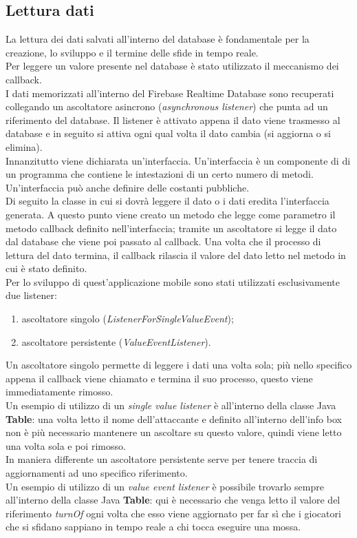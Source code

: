 \documentclass[a4paper,11pt,twoside,openright]{report}
\begin{document}
\subsection{Lettura dati}
La lettura dei dati salvati all'interno del database è fondamentale per la creazione, lo sviluppo e il termine delle sfide in tempo reale.\\
Per leggere un valore presente nel database è stato utilizzato il meccanismo dei callback.\\
I dati memorizzati all'interno del Firebase Realtime Database sono recuperati collegando un ascoltatore asincrono (\textit{asynchronous listener}) che punta ad un riferimento del database. Il listener è attivato appena il dato viene trasmesso al database e in seguito si attiva ogni qual volta il dato cambia (si aggiorna o si elimina).\\
Innanzitutto viene dichiarata un'interfaccia. Un'interfaccia è un componente di di un programma che contiene le intestazioni di un certo numero di metodi. Un'interfaccia può anche definire delle costanti pubbliche.\cite{9}\\ 
Di seguito la classe in cui si dovrà leggere il dato o i dati eredita l'interfaccia generata. A questo punto viene creato un metodo che legge come parametro il metodo callback definito nell'interfaccia; tramite un ascoltatore si legge il dato dal database che viene poi passato al callback. Una volta che il processo di lettura del dato termina, il callback rilascia il valore del dato letto nel metodo in cui è stato definito.\\
Per lo sviluppo di quest'applicazione mobile sono stati utilizzati esclusivamente due listener:

\begin{enumerate}
\item ascoltatore singolo (\textit{ListenerForSingleValueEvent});

\item ascoltatore persistente (\textit{ValueEventListener}).
\end{enumerate}

Un ascoltatore singolo permette di leggere i dati una volta sola; più nello specifico appena il callback viene chiamato e termina il suo processo, questo viene immediatamente rimosso.\\
Un esempio di utilizzo di un \textit{single value listener} è all'interno della classe Java \textbf{Table}: una volta letto il nome dell'attaccante e definito all'interno dell'info box non è più necessario mantenere un ascoltare su questo valore, quindi viene letto una volta sola e poi rimosso.\\
In maniera differente un ascoltatore persistente serve per tenere traccia di aggiornamenti ad uno specifico riferimento.\\
Un esempio di utilizzo di un \textit{value event listener} è possibile trovarlo sempre all'interno della classe Java \textbf{Table}: qui è necessario che venga letto il valore del riferimento \textit{turnOf} ogni volta che esso viene aggiornato per far sì che i giocatori che si sfidano sappiano in tempo reale a chi tocca eseguire una mossa.
\end{document}
